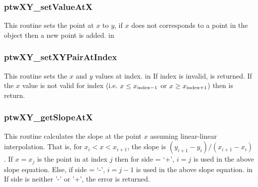 \subsubsection{ptwXY\_setValueAtX}
This routine sets the point at $x$ to $y$, if $x$ does not corresponds to a
point in the  object then a new point is added.
     in \noindent

\subsubsection{ptwXY\_setXYPairAtIndex}
This routine sets the $x$ and $y$ values at index.
     in \noindent
If index is invalid,  is returned. If the $x$ value is not valid for index (i.e. $x \le x_{\rm index-1}$ 
or $x \ge x_{\rm index+1}$) then  is return.

\subsubsection{ptwXY\_getSlopeAtX}
This routine calculates the slope at the point $x$ assuming linear-linear interpolation. That is, for $x_i < x < x_{i+1}$,
the slope is $( y_{i+1} - y_i ) / ( x_{i+1} - x_i )$. If $x = x_j$ is the point in  at
index $j$ then for side = `+', $i = j$ is used in the above slope equation. Else, if side = `-', $i = j-1$ is used in the above slope equation.
     in \noindent
If side is neither '-' or '+', the error  is returned.

